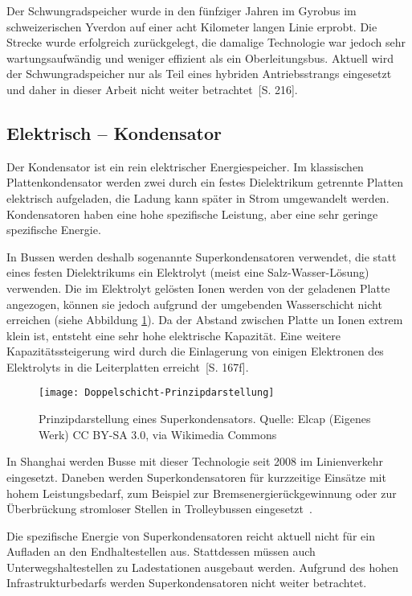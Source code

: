 Der Schwungradspeicher wurde in den fünfziger Jahren im Gyrobus im schweizerischen Yverdon auf einer acht Kilometer langen Linie erprobt. Die Strecke wurde erfolgreich zurückgelegt, die damalige Technologie war jedoch sehr wartungsaufwändig und weniger effizient als ein Oberleitungsbus. Aktuell wird der Schwungradspeicher nur als Teil eines hybriden Antriebsstrangs eingesetzt und daher in dieser Arbeit nicht weiter betrachtet~\cite{tub_aleph001746639}[S. 216].

\subsection{Elektrisch – Kondensator}
Der Kondensator ist ein rein elektrischer Energiespeicher. Im klassischen Plattenkondensator werden zwei durch ein festes Dielektrikum getrennte Platten elektrisch aufgeladen, die Ladung kann später in Strom umgewandelt werden. Kondensatoren haben eine hohe spezifische Leistung, aber eine sehr geringe spezifische Energie.

In Bussen werden deshalb sogenannte Superkondensatoren verwendet, die statt eines festen Dielektrikums ein Elektrolyt (meist eine Salz-Wasser-Lösung) verwenden. Die im Elektrolyt gelösten Ionen werden von der geladenen Platte angezogen, können sie jedoch aufgrund der umgebenden Wasserschicht nicht erreichen (siehe Abbildung \ref{abb_doppelschicht}). Da der Abstand zwischen Platte un Ionen extrem klein ist, entsteht eine sehr hohe elektrische Kapazität. Eine weitere Kapazitätssteigerung wird durch die Einlagerung von einigen Elektronen des Elektrolyts in die Leiterplatten erreicht~\cite{Sterner:2014}[S. 167f].

\begin{figure}\centering
	\texttt{[image: Doppelschicht-Prinzipdarstellung]}
	\caption[Prinzipdarstellung eines Superkondensators]{Prinzipdarstellung eines Superkondensators. Quelle: Elcap (Eigenes Werk) CC BY-SA 3.0, via Wikimedia Commons}
	\label{abb_doppelschicht}
\end{figure}

In Shanghai werden Busse mit dieser Technologie seit 2008 im Linienverkehr eingesetzt. Daneben werden Superkondensatoren für kurzzeitige Einsätze mit hohem Leistungsbedarf, zum Beispiel zur Bremsenergierückgewinnung oder zur Überbrückung stromloser Stellen in Trolleybussen eingesetzt~\cite{Barminer-Busgesellschaft:2012}.

Die spezifische Energie von Superkondensatoren reicht aktuell nicht für ein Aufladen an den Endhaltestellen aus. Stattdessen müssen auch Unterwegshaltestellen zu Ladestationen ausgebaut werden. Aufgrund des hohen Infrastrukturbedarfs werden Superkondensatoren nicht weiter betrachtet.

